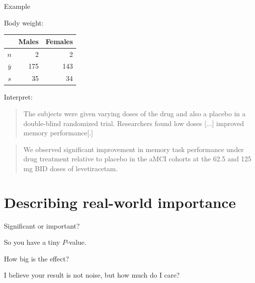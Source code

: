 \begin{frame}{Example}

  Body weight:
  \begin{center}
    \begin{tabular}{crr}
       & Males & Females \\
       \hline
       $n$ & 2 & 2 \\
       $\bar y$ & 175 & 143 \\
       $s$ & 35 & 34
     \end{tabular}

   \vspace{2em}

   \end{center}

\end{frame}


\begin{frame}{Interpret:}

    \begin{quote}
        The subjects were given varying doses of the drug and also a placebo in a double-blind randomized trial. Researchers found low doses [...] improved memory performance[.]
    \end{quote}

    \vfill
    \pause

    \begin{quote}
        We observed significant improvement in memory task performance under drug treatment relative to placebo in the aMCI cohorts at the 62.5 and 125 mg BID doses of levetiracetam.
    \end{quote}

\end{frame}



\section{Describing real-world importance}

\begin{frame}{Significant or important?}
    \vfill

    So you have a \alert{tiny $P$-value}.

    \vfill

    How big is the effect?

    \vfill
    \pause

     I believe your result is not noise,
    but how much \alert{do I care?}

\end{frame}


